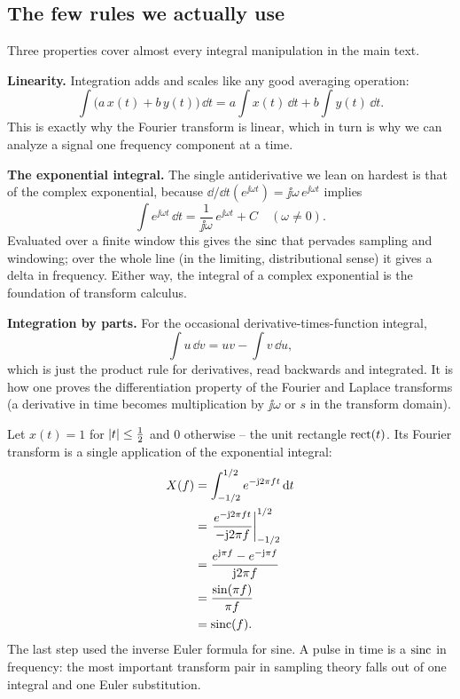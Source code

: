 \subsection{The few rules we actually use}

Three properties cover almost every integral manipulation in the main text.

\textbf{Linearity.} Integration adds and scales like any good averaging operation:
\[
  \int \big(a\,x(t) + b\,y(t)\big)\,\dd t = a\int x(t)\,\dd t + b\int y(t)\,\dd t.
\]
This is exactly why the Fourier transform is linear, which in turn is why we can analyze a signal
one frequency component at a time.

\textbf{The exponential integral.} The single antiderivative we lean on hardest is that of the
complex exponential, because $\dd/\dd t (e^{\jj\omega t}) = \jj\omega\,e^{\jj\omega t}$ implies
\[
  \int e^{\jj\omega t}\,\dd t = \frac{1}{\jj\omega}\,e^{\jj\omega t} + C \quad(\omega\neq 0).
\]
Evaluated over a finite window this gives the $\operatorname{sinc}$ that pervades sampling and windowing; over
the whole line (in the limiting, distributional sense) it gives a delta in frequency. Either way,
the integral of a complex exponential is the foundation of transform calculus.

\textbf{Integration by parts.} For the occasional derivative-times-function integral,
\[
  \int u\,\dd v = uv - \int v\,\dd u,
\]
which is just the product rule for derivatives, read backwards and integrated. It is how one
proves the differentiation property of the Fourier and Laplace transforms (a derivative in time
becomes multiplication by $\jj\omega$ or $s$ in the transform domain).

\begin{example}
\label{ch42:ex-rect}
Let $x(t) = 1$ for $\lvert t\rvert\le \tfrac12$ and $0$ otherwise -- the unit rectangle $\operatorname{rect}(t)$. Its
Fourier transform is a single application of the exponential integral:
\begin{align*}
  X(f) &= \int_{-1/2}^{1/2} e^{-\mathrm{j} 2\pi f t}\,\mathrm{d} t \\
  &= \left.\frac{e^{-\mathrm{j} 2\pi f t}}{-\mathrm{j} 2\pi f}\right|_{-1/2}^{1/2} \\
  &= \frac{e^{\mathrm{j}\pi f} - e^{-\mathrm{j}\pi f}}{\mathrm{j} 2\pi f} \\
  &= \frac{\sin(\pi f)}{\pi f} \\
  &= \operatorname{sinc}(f).
\end{align*}
The last step used the inverse Euler formula for sine. A pulse in time is a $\operatorname{sinc}$ in frequency:
the most important transform pair in sampling theory falls out of one integral and one Euler
substitution.
\end{example}

